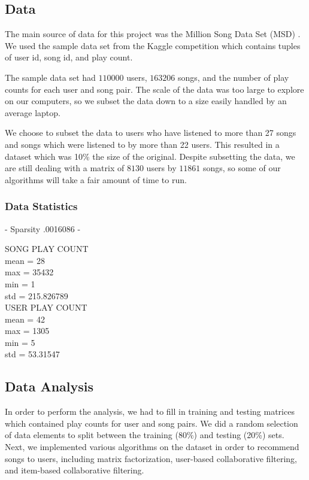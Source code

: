 \documentclass[12pt,preprint]{aastex}
\begin{document}
\subsection{Data}
The main source of data for this project was the Million Song Data Set (MSD)  \citep{Bertin-Mahieux2011}. We used the sample data set from the Kaggle competition which contains tuples of user id, song id, and play count.  

The sample data set had $110000$ users, $163206$ songs, and the number of play counts for each user and song pair.
The scale of the data was too large to explore on our computers, so we subset the data down to a size easily handled by an average laptop. 

We choose to subset the data to users who have listened to more than 27 songs and songs which were listened to by more than 22 users. This resulted in a dataset which was 10\% the size of the original. Despite subsetting the data, we are still dealing with a matrix of $8130$ users by $11861$ songs, so some of our algorithms will take a fair amount of time to run.

\subsubsection{Data Statistics}

- Sparsity .0016086
- 

SONG PLAY COUNT  \\
mean = 28 \\
max = 35432 \\
min = 1 \\
std = 215.826789\\

USER PLAY COUNT\\
mean = 42\\
max = 1305\\
min = 5\\
std = 53.31547\\


\subsection{Data Analysis}
In order to perform the analysis, we had to fill in training and testing matrices which contained play counts for user and song pairs. We did a random selection of data elements to split between the training (80\%) and testing (20\%) sets. Next, we implemented various algorithms on the dataset in order to recommend songs to users, including matrix factorization, user-based collaborative filtering, and item-based collaborative filtering.
\end{document}
